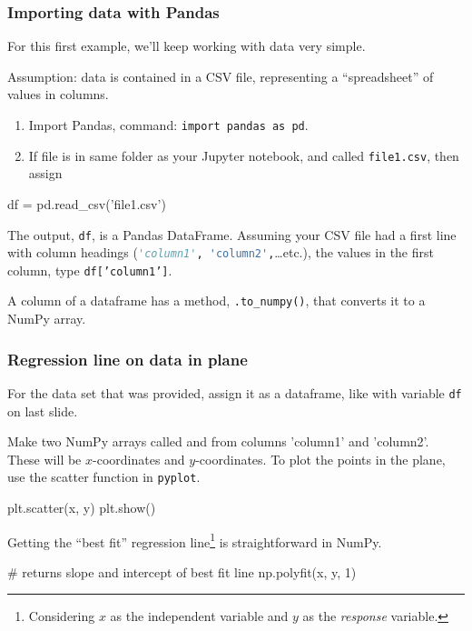 \documentclass{beamer}
\newenvironment{codeblock}
    {\hfill\begin{beamerboxesrounded}[lower=codecol, width=0.8\textwidth]
    \medskip

    }
    { 
    \end{beamerboxesrounded}\hfill
    }
\theoremstyle{example}
\newcommand{\ct}[1]{\lstinline[language=Python]!#1!}
\newcommand{\ttt}[1]{{\small\texttt{#1}}}
\begin{document}
\begin{frame}[fragile]
    \frametitle{Importing data with Pandas}
For this first example, we'll keep working with data very simple. 

Assumption: data is contained in a CSV file, representing a ``spreadsheet'' of values in columns.

\begin{enumerate}
    \item Import Pandas, command: \ttt{import pandas as pd}.
    \item If file is in same folder as your Jupyter notebook, and called \ttt{file1.csv}, then assign 
\end{enumerate}

\begin{codeblock}

\begin{python}[numbers=none]
df = pd.read_csv('file1.csv')
\end{python}

\end{codeblock}

The output, \ttt{df}, is a Pandas DataFrame. Assuming your CSV file had a first line with column headings (\ct{'column1', 'column2',}\ldots etc.), the values in the first column, type \ttt{df['column1']}.

A column of a dataframe has a method, \ct{.to_numpy()}, that converts it to a NumPy array.
\end{frame}

\begin{frame}[fragile]
    \frametitle{Regression line on data in plane}
For the data set that was provided, assign it as a dataframe, like with variable \ct{df} on last slide. 

Make two NumPy arrays called \ttt{} and \ttt{} from columns 'column1' and 'column2'. These will be $x$-coordinates and $y$-coordinates. To plot the points in the plane, use the scatter function in \ttt{pyplot}.

\begin{codeblock}

\begin{python}
plt.scatter(x, y)
plt.show()
\end{python}

\end{codeblock}

Getting the ``best fit'' regression line\footnote{Considering $x$ as the independent variable and $y$ as the \emph{response} variable.} is straightforward in NumPy. 

\begin{codeblock}

\begin{python}
# returns slope and intercept of best fit line
np.polyfit(x, y, 1)
\end{python}
    
\end{codeblock}
    
\end{frame}
\end{document}

